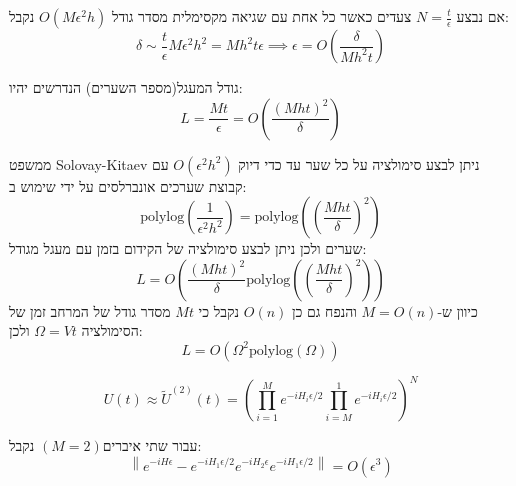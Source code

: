 \documentclass{tstextbook}
\begin{document}
\begin{corollary}
אם נבצע \(N=\frac{t}{\epsilon}\) צעדים כאשר כל אחת עם שגיאה מקסימלית מסדר גודל \(O\left( M\epsilon^{2}h \right)\) נקבל:
$$\delta\sim\frac{t}{\epsilon}M\epsilon^{2}h^{2}=M h^{2}t\epsilon\implies\epsilon=O\left(\frac{\delta}{M h^{2}t}\right)$$

\end{corollary}
\begin{corollary}
גודל המעגל(מספר השערים) הנדרשים יהיו:
$$L=\frac{M t}{\epsilon}=O\left(\frac{\left(M h t\right)^{2}}{\delta}\right)$$

\end{corollary}
\begin{corollary}
ממשפט Solovay-Kitaev ניתן לבצע סימולציה על כל שער עד כדי דיוק \(O\left( \epsilon^{2}h^{2} \right)\) עם קבוצת שערכים אונברלסים על ידי שימוש ב:
$$\mathrm{polylog}\left(\frac{1}{\epsilon^{2}h^{2}}\right)=\mathrm{polylog}\left(\left(\frac{M h t}{\delta}\right)^{2}\right)$$
שערים ולכן ניתן לבצע סימולציה של הקידום בזמן עם מעגל מגודל:
$$L=O\left(\frac{\left(M h t\right)^{2}}{\delta}\mathrm{polylog}\left(\left(\frac{M h t}{\delta}\right)^{2}\right)\right)$$
כיוון ש-\(M=O(n)\) והנפח גם כן \(O(n)\) נקבל כי \(Mt\) מסדר גודל של המרחב זמן של הסימולציה \(\Omega=Vt\) ולכן:
$$L=O\left(\Omega^{2}\mathrm{polylog}{\left( \Omega \right)}\right)$$

\end{corollary}
\begin{proposition}
$$U\left(t\right)\approx\widetilde{U}^{\left(2\right)}\left(t\right)=\left(\prod_{i=1}^{M}e^{-i H_{i}\epsilon/2}\prod_{i=M}^{1}e^{-i H_{i}\epsilon/2}\right)^{N}$$

\end{proposition}
\begin{lemma}
עבור שתי איברים\((M=2)\) נקבל:
$$\left\|e^{-i H\epsilon}-e^{-i H_{1}\epsilon/2}e^{-i H_{2}\epsilon}e^{-i H_{1}\epsilon/2}\right\|=O\left(\epsilon^{3}\right)$$

\end{lemma}
\end{document}
